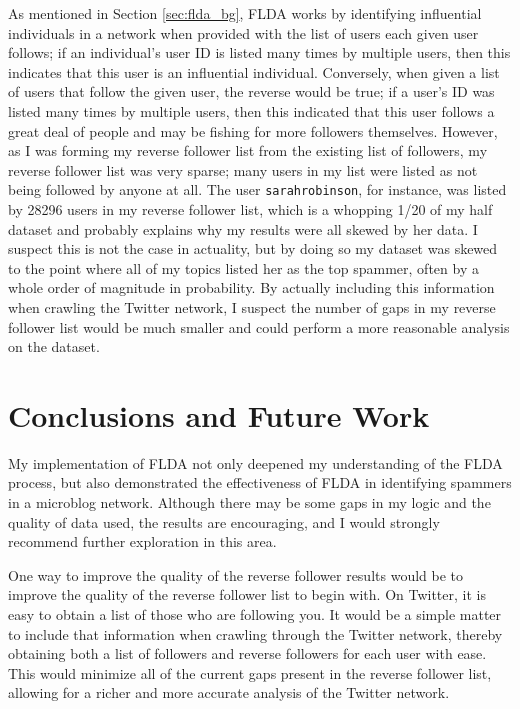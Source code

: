 \documentclass[a4paper]{article}
\begin{document}
As mentioned in Section \ref{sec:flda_bg}, FLDA works by identifying influential individuals in a network when provided with the list of users each given user follows; if an individual's user ID is listed many times by multiple users, then this indicates that this user is an influential individual. Conversely, when given a list of users that follow the given user, the reverse would be true; if a user's ID was listed many times by multiple users, then this indicated that this user follows a great deal of people and may be fishing for more followers themselves. However, as I was forming my reverse follower list from the existing list of followers, my reverse follower list was very sparse; many users in my list were listed as not being followed by anyone at all. The user \verb+sarahrobinson+, for instance, was listed by 28296 users in my reverse follower list, which is a whopping 1/20 of my half dataset and probably explains why my results were all skewed by her data. I suspect this is not the case in actuality, but by doing so my dataset was skewed to the point where all of my topics listed her as the top spammer, often by a whole order of magnitude in probability. By actually including this information when crawling the Twitter network, I suspect the number of gaps in my reverse follower list would be much smaller and could perform a more reasonable analysis on the dataset.

\section{Conclusions and Future Work}
\label{sec:conc}
My implementation of FLDA not only deepened my understanding of the FLDA process, but also demonstrated the effectiveness of FLDA in identifying spammers in a microblog network. Although there may be some gaps in my logic and the quality of data used, the results are encouraging, and I would strongly recommend further exploration in this area.

One way to improve the quality of the reverse follower results would be to improve the quality of the reverse follower list to begin with. On Twitter, it is easy to obtain a list of those who are following you. It would be a simple matter to include that information when crawling through the Twitter network, thereby obtaining both a list of followers and reverse followers for each user with ease. This would minimize all of the current gaps present in the reverse follower list, allowing for a richer and more accurate analysis of the Twitter network.
\end{document}
